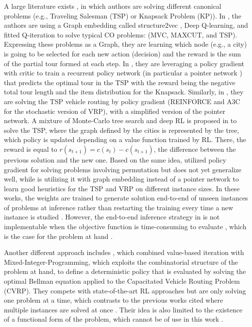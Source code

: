 \documentclass[a4paper]{article}
\begin{document}
A large literature exists \cite{mazyavkina2021reinforcement,li2021deep}, in which authors are solving different canonical problems (e.g., Traveling Salesman (TSP) or Knapsack Problem (KP)). In \cite{khalil2017learning}, the authors are using a Graph embedding called structure2vec \cite{dai2016discriminative}, Deep Q-learning, and fitted Q-iteration to solve typical CO problems: (MVC, MAXCUT, and TSP). Expressing these problems as a Graph, they are learning which node (e.g., a city) is going to be selected for each new action (decision) and the reward is the sum of the partial tour formed at each step. In \cite{bello2016neural}, they are leveraging a policy gradient with critic to train a recurrent policy network (in particular a pointer network \cite{vinyals2015pointer}) that predicts the optimal tour in the TSP with the reward being the negative total tour length  and the item distribution for the Knapsack. Similarly, in \cite{nazari2018deep}, they are solving the TSP vehicle routing by policy gradient (REINFORCE \cite{williams1992simple} and A3C \cite{mnih2016asynchronous} for the stochastic version of VRP), with a simplified version of the pointer network. A mixture of Monte-Carlo tree search and deep RL is proposed in \cite{xing2020solve} to solve the TSP, where the graph defined by the cities is represented by the tree, which policy is updated depending on a value function trained by RL. There, the reward is equal to $r(s_{t+1}) = c(s_t) - c(s_{t+1})$, the difference between the previous solution and the new one.  Based on the same idea, \cite{emami2018learning} utilized policy gradient for solving problems involving permutation but does not yet generalize well, while \cite{kool2018attention} is utilizing it with graph embedding instead of a pointer network to learn good heuristics for the TSP and VRP on different instance sizes. In these works, the weights are trained to generate solution end-to-end of unseen instances of problems at inference rather than restarting the training every time a new instance is studied \cite{mazyavkina2021reinforcement}. However, the end-to-end inference strategy in \cite{li2021deep} is not implementable when the objective function is time-consuming to evaluate \cite{solozabal2020constrained}, which is the case for the problem at hand \cite{seurin2022pwr}.

Another different approach includes \cite{delarue2020reinforcement}, which combined value-based iteration with Mixed-Integer-Programming, which exploits the combinatorial structure of the problem at hand, to define a deterministic policy that is evaluated by solving the optimal Bellman equation applied to the Capacitated Vehicle Routing Problem (CVRP). They compete with state-of-the-art RL approaches but are only solving one problem at a time, which contrasts to the previous works cited where multiple instances are solved at once \cite{mazyavkina2021reinforcement}. Their idea is also limited to the existence of a functional form of the problem, which cannot be of use in this work \cite{seurin2022pwr}.
\end{document}

